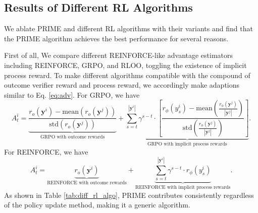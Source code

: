 \subsection{Results of Different RL Algorithms}
\label{sec:diff_rl_algo}






We ablate PRIME and different RL algorithms with their variants and find that the PRIME algorithm achieves the best performance for several reasons. 

First of all, We compare different REINFORCE-like advantage estimators including REINFORCE, GRPO, and RLOO, toggling the existence of implicit process reward. To make different algorithms compatible with the compound of outcome verifier reward and process reward, we accordingly make adaptions similar to Eq. \ref{eq:adv}. For GRPO, we have
\begin{equation}
        A^i_t = \underbrace{\frac{r_{o}\left(\mathbf{y}^i\right)-\text{mean}( r_o\left(\mathbf{y}^j\right))}{\text{std}( r_o\left(\mathbf{y}^j\right))}}_\text{GRPO with outcome rewards} + \underbrace{\sum_{s=t}^{|\mathbf{y}^i|} \gamma^{s-t} \cdot \left[\frac{r_\phi(y^i_s)-\text{mean}\left(\frac{r_\phi \left(\mathbf{y}^j\right)}{|\mathbf{y}^j|}\right)}{\text{std}\left(\frac{r_\phi \left(\mathbf{y}^j\right)}{|\mathbf{y}^j|}\right)}\right]}_\text{GRPO with implicit process rewards}.
\end{equation}
For REINFORCE, we have
\begin{equation}
A^i_t = \underbrace{r_o\left(\mathbf{y}^i\right)}_\text{REINFORCE with outcome rewards} + \underbrace{\sum_{s=t}^{|\mathbf{y}^i|} \gamma^{s-t} \cdot r_\phi(y^i_s)}_\text{REINFORCE with implicit process rewards}.
\end{equation}
As shown in Table \ref{tab:diff_rl_algo}, PRIME contributes consistently regardless of the policy update method, making it a generic algorithm. 


